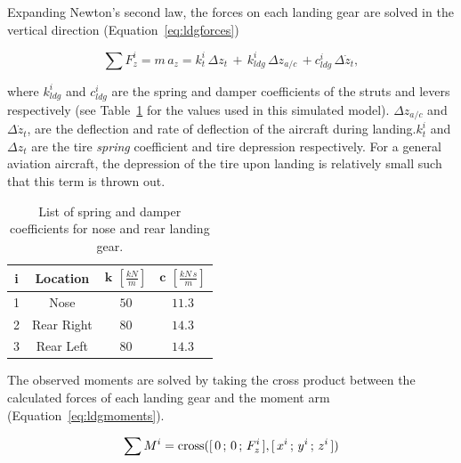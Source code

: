 Expanding Newton's second law, the forces on each landing gear are solved in the vertical direction (Equation~\ref{eq:ldgforces})

\begin{equation}
    \sum F^i_z = m\,a_z = k^i_t\, \Delta z_t\, + \, k^i_{ldg}\, \Delta z_{a/c}\, + c^i_{ldg}\, \Delta \dot{z}_t,
    \label{eq:ldgforces}
\end{equation}

where \(k^i_{ldg}\) and \(c^i_{ldg}\) are the spring and damper coefficients of the struts and levers respectively (see Table~\ref{tbl:ldgcoeff} for the values used in this simulated model). \(\Delta z_{a/c}\) and \(\Delta \dot{z}_t\), are the deflection and rate of deflection of the aircraft during landing.\( k^i_t \) and \(\Delta z_t\) are the tire \textit{spring} coefficient and tire depression respectively. For a general aviation aircraft, the depression of the tire upon landing is relatively small such that this term is thrown out.

\begin{table}[!ht]\label{tbl:ldgcoeff}
    \caption{List of spring and damper coefficients for nose and rear landing gear.}
    \centering
    \begin{tabular}{cccc}
        \toprule
        \textbf{i} & \textbf{Location} & \(\mathbf{k}\) \(  \left[\frac{kN}{m}\right]\) & \(\mathbf{c}\) \( \left[\frac{kN\,s}{m}\right]\) \\
        \midrule
        1          & Nose              & \(50\)                                         & \(11.3\)                                         \\
        2          & Rear Right        & \(80\)                                         & \(14.3\)                                         \\
        3          & Rear Left         & \(80\)                                         & \(14.3\)                                         \\
        \bottomrule
    \end{tabular}
\end{table}

The observed moments are solved by taking the cross product between the calculated forces of each landing gear and the moment arm (Equation~\ref{eq:ldgmoments}).

\begin{equation}
    \sum M^i = \textnormal{cross}([\,0\,;\,0\,;\,F^i_z\,],[\,x^i\,;\,y^i\,;\,z^i\,])
    \label{eq:ldgmoments}
\end{equation}


